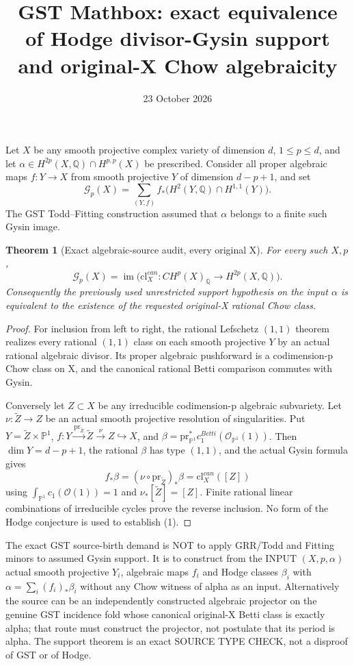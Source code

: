 \documentclass{article}
\title{GST Mathbox: exact equivalence of Hodge divisor-Gysin support and original-X Chow algebraicity}
\date{23 October 2026}
\newtheorem{theorem}{Theorem}
\begin{document}
\maketitle
Let $X$ be any smooth projective complex variety of dimension $d$,
$1\le p\le d$, and let
$\alpha\in H^{2p}(X,\mathbb Q)\cap H^{p,p}(X)$ be prescribed.
Consider all proper algebraic maps $f:Y\to X$
from smooth projective $Y$ of dimension $d-p+1$, and set
\[
 \mathcal G_p(X)=\sum_{(Y,f)}
 f_*\bigl(H^2(Y,\mathbb Q)\cap H^{1,1}(Y)\bigr).
\]
The GST Todd--Fitting construction assumed that $\alpha$
belongs to a finite such Gysin image.
\begin{theorem}[Exact algebraic-source audit, every original X]
For every such $X,p$,
\[
 \boxed{\mathcal G_p(X)=
 \operatorname{im}\bigl(
 \mathrm{cl}^{can}_X:CH^p(X)_{\mathbb Q}\to H^{2p}(X,\mathbb Q)\bigr).}
 \tag{1}
\]
Consequently the previously used unrestricted support
hypothesis on the input $\alpha$ is equivalent to
the existence of the requested original-X rational Chow class.
\end{theorem}
\begin{proof}
For inclusion from left to right, the rational Lefschetz
$(1,1)$ theorem realizes every rational $(1,1)$ class
on each smooth projective $Y$ by an actual rational
algebraic divisor. Its proper algebraic pushforward
is a codimension-p Chow class on X, and the
canonical rational Betti comparison commutes with Gysin.

Conversely let $Z\subset X$ be any irreducible
codimension-p algebraic subvariety. Let
$\nu:\widetilde Z\to Z$ be an actual smooth
projective resolution of singularities.
Put $Y=\widetilde Z\times\mathbb P^1$,
$f:Y\xrightarrow{\mathrm{pr}_{\widetilde Z}}
\widetilde Z\xrightarrow{\nu}Z\hookrightarrow X$,
and $\beta=\mathrm{pr}_{\mathbb P^1}^*
c_1^{Betti}(\mathcal O_{\mathbb P^1}(1))$.
Then $\dim Y=d-p+1$, the rational $\beta$
has type $(1,1)$, and the actual Gysin formula gives
\[
 \boxed{f_*\beta=
 (\nu\circ\mathrm{pr}_{\widetilde Z})_*\beta
 =\mathrm{cl}^{can}_X([Z])}
 \tag{2}
\]
using $\int_{\mathbb P^1}c_1(\mathcal O(1))=1$
and $\nu_*[\widetilde Z]=[Z]$.
Finite rational linear combinations of irreducible
cycles prove the reverse inclusion. No form of the
Hodge conjecture is used to establish (1).
\end{proof}

The exact GST source-birth demand is NOT to apply
GRR/Todd and Fitting minors to assumed Gysin support.
It is to construct from the INPUT $(X,p,\alpha)$
actual smooth projective $Y_i$, algebraic maps $f_i$
and Hodge classes $\beta_i$ with
$\alpha=\sum_i(f_i)_*\beta_i$ without
any Chow witness of alpha as an input.
Alternatively the source can be an independently
constructed algebraic projector on the genuine GST
incidence fold whose canonical original-X Betti
class is exactly alpha; that route must construct
the projector, not postulate that its period is alpha.
The support theorem is an exact SOURCE TYPE CHECK,
not a disproof of GST or of Hodge.
\end{document}
